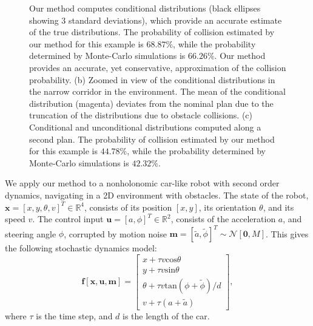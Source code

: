 \begin{figure}[!t]
{Our method computes conditional distributions (black ellipses showing $3$ standard deviations), which provide an accurate estimate of the true distributions. The probability of collision estimated by our method for this example is $68.87\%$, while the probability determined by Monte-Carlo simulations is $66.26\%$. Our method provides an accurate, yet conservative, approximation of the collision probability. (b) Zoomed in view of the conditional distributions in the narrow corridor in the environment. The mean of the conditional distribution (magenta) deviates from the nominal plan due to the truncation of the distributions due to obstacle collisions. (c) Conditional and unconditional distributions computed along a second plan. The probability of collision estimated by our method for this example is $44.78\%$, while the probability determined by Monte-Carlo simulations is $42.32\%$.}
\vspace*{-15pt}
\label{fig:car2d}
\end{figure}

We apply our method to a nonholonomic car-like robot with second order dynamics, navigating in a 2D environment with obstacles. The state of the robot, $\mathbf{x} = [x, y, \theta, v]^T \in \mathbb{R}^4$, consists of its position $[x, y]$, its orientation $\theta$, and its speed $v$. The control input $\mathbf{u} = [a, \phi]^T \in \mathbb{R}^2$, consists of the acceleration $a$, and steering angle $\phi$, corrupted by motion noise $\mathbf{m} = [\tilde{a}, \tilde{\phi}]^T \sim \mathcal{N}[\mathbf{0}, M]$. This gives the following stochastic dynamics model:
\begin{equation}
\mathbf{f}[\mathbf{x}, \mathbf{u}, \mathbf{m}] = \begin{bmatrix} x + \tau v \mathrm{cos}\theta \\ y + \tau v \mathrm{sin}\theta \\ \theta + \tau v \mathrm{tan}(\phi + \tilde{\phi})/d \\ v + \tau(a + \tilde{a}) \end{bmatrix},
\end{equation}
where $\tau$ is the time step, and $d$ is the length of the car.

